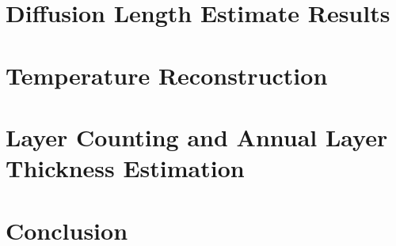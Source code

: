 \documentclass[11pt]{memoir}
\begin{document}
\chapter[Results]{Diffusion Length Estimate Results}



\chapter[Temperature Reconstruction]{Temperature Reconstruction}




\chapter[Layer Counting][Layer Counting]{Layer Counting and Annual Layer Thickness Estimation}





\chapter[Conclusion][Conclusion]{Conclusion}




\backmatter

 



\end{document}
